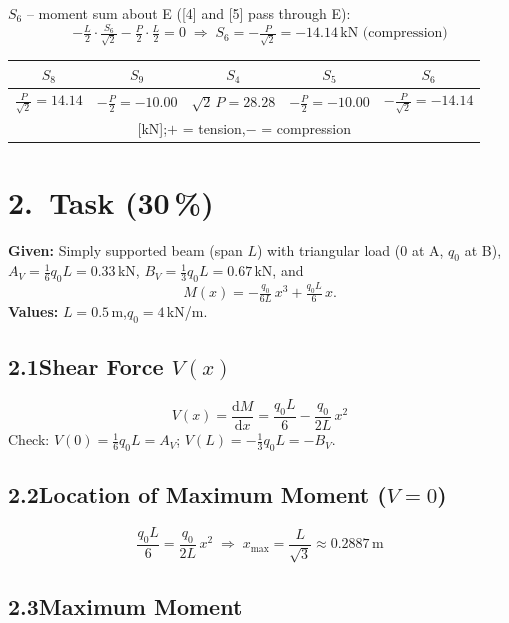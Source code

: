 \documentclass[a4paper,11pt]{article}
\begin{document}
\textbf{$S_6$} -- moment sum about E ([4] and [5] pass through E):
\[
  -\tfrac{L}{2}\cdot\tfrac{S_6}{\sqrt{2}} - \tfrac{P}{2}\cdot\tfrac{L}{2} = 0
  \;\Rightarrow\; \boxed{S_6 = -\tfrac{P}{\sqrt{2}} = -14.14\,\text{kN (compression)}}
\]

\medskip
\begin{center}
\begin{tabular}{ccccc}
\toprule
$S_8$ & $S_9$ & $S_4$ & $S_5$ & $S_6$ \\
\midrule
$\tfrac{P}{\sqrt{2}} = 14.14$ & $-\tfrac{P}{2} = -10.00$ &
$\sqrt{2}\,P = 28.28$ & $-\tfrac{P}{2} = -10.00$ & $-\tfrac{P}{\sqrt{2}} = -14.14$ \\
\multicolumn{5}{c}{\small [kN];\quad $+$ = tension,\quad $-$ = compression} \\
\bottomrule
\end{tabular}
\end{center}

\newpage
\section*{2.~Task \hfill (30\,\%)}

\textbf{Given:} Simply supported beam (span $L$) with triangular load
(0 at A, $q_0$ at B),
$A_V = \tfrac{1}{6}q_0 L = 0.33$\,kN,
$B_V = \tfrac{1}{3}q_0 L = 0.67$\,kN, and
\[
  M(x) = -\tfrac{q_0}{6L}\,x^3 + \tfrac{q_0 L}{6}\,x.
\]
\textbf{Values:} $L = 0.5$\,m,\quad $q_0 = 4$\,kN/m.

\subsection*{2.1\quad Shear Force $V(x)$}

\[
  V(x) = \frac{\mathrm{d}M}{\mathrm{d}x}
        = \frac{q_0 L}{6} - \frac{q_0}{2L}\,x^2
\]
Check: $V(0) = \tfrac{1}{6}q_0 L = A_V$\;\checkmark;\quad
$V(L) = -\tfrac{1}{3}q_0 L = -B_V$\;\checkmark.

\subsection*{2.2\quad Location of Maximum Moment ($V = 0$)}

\[
  \frac{q_0 L}{6} = \frac{q_0}{2L}\,x^2
  \;\Rightarrow\; \boxed{x_{\max} = \frac{L}{\sqrt{3}} \approx 0.2887\,\text{m}}
\]

\subsection*{2.3\quad Maximum Moment}
\end{document}
